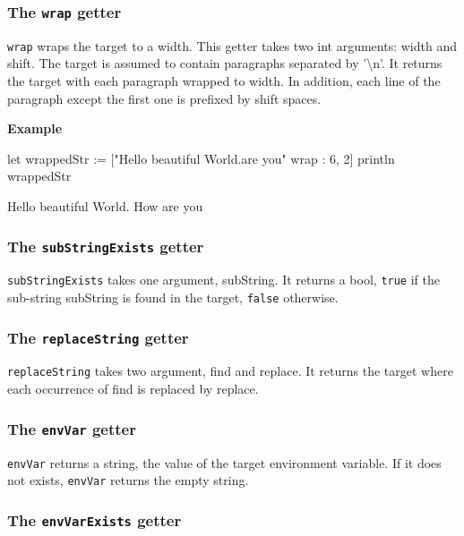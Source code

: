 \documentclass[10pt,openright,twosides,final]{memoir}
\newcommand{\ccst}[1]{{\footnotesize\ttfamily\colorbox{light-blue}{'#1'}}}
\newcommand{\gtlarg}[1]{{\footnotesize\ttfamily\colorbox{light-blue}{#1}}}
\newcommand{\gtlinline}[1]{\colorbox{light-blue}{\lstinline[language=gtl]{#1}}}
\newcommand{\example}{\vspace{.75em}\noindent\textbf{Example}\vspace{0em}}
\begin{document}
\subsubsection{The \texttt{wrap} getter}

\gtlinline{wrap} wraps the target to a width. This getter takes two int arguments: \gtlarg{width} and \gtlarg{shift}. The target is assumed to contain paragraphs separated by \ccst{\textbackslash n}. It returns the target with each paragraph wrapped to \gtlarg{width}. In addition, each line of the paragraph except the first one is prefixed by \gtlarg{shift} spaces.

\example
\begin{gtl}
let wrappedStr := ["Hello beautiful World.\nHow are you" wrap : 6, 2]
println wrappedStr
\end{gtl}
\begin{console}
Hello 
  beautiful 
  World. 
How 
  are 
  you 
\end{console}

\subsubsection{The \texttt{subStringExists} getter}

\gtlinline{subStringExists} takes one argument, \gtlarg{subString}. It returns a bool, \gtlinline{true} if the sub-string \gtlarg{subString} is found in the target, \gtlinline{false} otherwise.

\subsubsection{The \texttt{replaceString} getter}

\gtlinline{replaceString} takes two argument, \gtlarg{find} and \gtlarg{replace}. It returns the target where each occurrence of \gtlarg{find} is replaced by \gtlarg{replace}.

\subsubsection{The \texttt{envVar} getter}

\gtlinline{envVar} returns a string, the value of the target environment variable. If it does not exists, \gtlinline{envVar} returns the empty string.

\subsubsection{The \texttt{envVarExists} getter}
\end{document}
